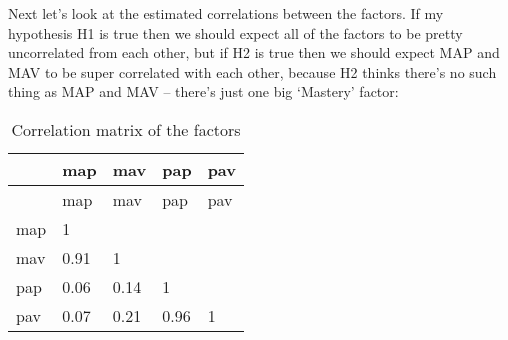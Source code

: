 \documentclass[
  letterpaper,
  DIV=11,
  numbers=noendperiod]{scrreprt}
\newenvironment{Shaded}{\begin{snugshade}}{\end{snugshade}}
\newcommand{\AttributeTok}[1]{\textcolor[rgb]{0.40,0.45,0.13}{#1}}
\newcommand{\CommentTok}[1]{\textcolor[rgb]{0.37,0.37,0.37}{#1}}
\newcommand{\DecValTok}[1]{\textcolor[rgb]{0.68,0.00,0.00}{#1}}
\newcommand{\DocumentationTok}[1]{\textcolor[rgb]{0.37,0.37,0.37}{\textit{#1}}}
\newcommand{\FunctionTok}[1]{\textcolor[rgb]{0.28,0.35,0.67}{#1}}
\newcommand{\NormalTok}[1]{\textcolor[rgb]{0.00,0.23,0.31}{#1}}
\newcommand{\SpecialCharTok}[1]{\textcolor[rgb]{0.37,0.37,0.37}{#1}}
\newcommand{\StringTok}[1]{\textcolor[rgb]{0.13,0.47,0.30}{#1}}
\begin{document}
Next let's look at the estimated correlations between the factors. If my
hypothesis H1 is true then we should expect all of the factors to be
pretty uncorrelated from each other, but if H2 is true then we should
expect MAP and MAV to be super correlated with each other, because H2
thinks there's no such thing as MAP and MAV -- there's just one big
`Mastery' factor:

\begin{Shaded}
\end{Shaded}

\begin{longtable}[]{@{}lllll@{}}
\caption{Correlation matrix of the factors}\tabularnewline
\toprule()
& map & mav & pap & pav \\
\midrule()
\endfirsthead
\toprule()
& map & mav & pap & pav \\
\midrule()
\endhead
map & 1 & & & \\
mav & 0.91 & 1 & & \\
pap & 0.06 & 0.14 & 1 & \\
pav & 0.07 & 0.21 & 0.96 & 1 \\
\bottomrule()
\end{longtable}
\end{document}
